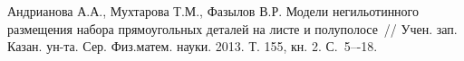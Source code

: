 \begin{thebibliography}{9} %
 Андрианова А.А., Мухтарова Т.М., Фазылов В.Р. Модели негильотинного размещения
набора прямоугольных деталей на листе и полуполосе~// Учен. зап. Казан. ун-та. Сер. Физ.матем. науки. 2013. Т. 155, кн. 2. С.~5–-18.

\end{thebibliography}




%

